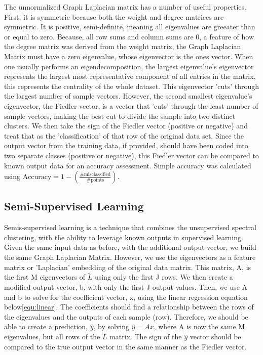 \documentclass[11pt]{amsart}
\begin{document}
The unnormalized Graph Laplacian matrix has a number of useful properties. First, it is symmetric because both the weight and degree 
matrices are symmetric. It is positive, semi-definite, meaning all eigenvalues are greeater than or equal to zero. Because, all row sums and 
column sums are 0, a feature of how the degree matrix was derived from the weight matrix, the Graph Laplacian Matrix must have a zero eigenvalue, 
whose eigenvector is the ones vector. When one usually performs an eigendecomposition, the largest eigenvalue's eigenvector represents the largest 
most representative component of all entries in the matrix, this represents the centrality of the whole dataset. This eigenvector 'cuts' through 
the largest number of sample vectors. However, the second smallest eigenvalue's eigenvector, the Fiedler vector, is a vector that 'cuts' through 
the least number of sample vectors, making the best cut to divide the sample into two distinct clusters. We then take the sign of the Fiedler vector 
(positive or negative) and treat that as the 'classification' of that row of the original data set. Since the output vector from the training data, if 
provided, should have been coded into two separate classes (positive or negative), this Fiedler vector can be compared to known output data for an accuracy 
assessment. Simple accuracy was calculated using $\text{Accuracy} = 1 - \left( \frac{\#\text{misclassified}}{\#\text{points}} \right) $.

\subsection{Semi-Supervised Learning}\label{sec:Semi-supervised-learning}

Semis-supervised learning is a technique that combines the unsupervised spectral clustering, with the ability to leverage known outputs in 
supervised learning. Given the same input data as before, with the additional output vector, we build the same Graph Laplacian Matrix. However, we use 
the eigenvectors as a feature matrix or 'Laplacian' embedding of the original data matrix. This matrix, A, is the first M eigenvectors of $\tilde{L}$ using only 
the first J rows. We then create a modified output vector, b, with only the first J output values. Then, we use A and b to solve for the coefficient vector, x, 
using the linear regression equation below\eqref{equ:linear}. The coefficients should find a relationship between the rows of the eigenvalues and the outputs of 
each sample (row). Therefore, we should be able to create a prediction, $\hat{y}$, by solving $\hat{y} = Ax$, where A is now the same M eigenvalues, but 
all rows of the $\tilde{L}$ matrix. The sign of the $\hat{y}$ vector should be compared to the true output vector in the same manner as the Fiedler vector.
\end{document}
